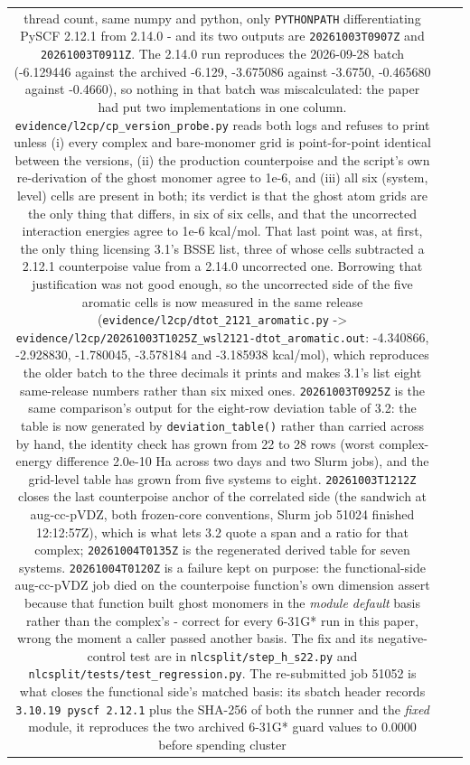 \documentclass[11pt]{article}
\begin{document}
\begin{longtable}{c>{\raggedright\arraybackslash}p{}>{\raggedright\arraybackslash}p{}}
thread count, same numpy and python, only \texttt{PYTHONPATH} differentiating PySCF 2.12.1 from 2.14.0 - and its two outputs are \texttt{20261003T0907Z} and \texttt{20261003T0911Z}. The 2.14.0 run reproduces the 2026-09-28 batch (-6.129446 against the archived -6.129, -3.675086 against -3.6750, -0.465680 against -0.4660), so nothing in that batch was miscalculated: the paper had put two implementations in one column. \texttt{evidence/\allowbreak{}l2cp/\allowbreak{}cp\_\allowbreak{}version\_\allowbreak{}probe.py} reads both logs and refuses to print unless (i) every complex and bare-monomer grid is point-for-point identical between the versions, (ii) the production counterpoise and the script's own re-derivation of the ghost monomer agree to 1e-6, and (iii) all six (system, level) cells are present in both; its verdict is that the ghost atom grids are the only thing that differs, in six of six cells, and that the uncorrected interaction energies agree to 1e-6 kcal/mol. That last point was, at first, the only thing licensing 3.1's BSSE list, three of whose cells subtracted a 2.12.1 counterpoise value from a 2.14.0 uncorrected one. Borrowing that justification was not good enough, so the uncorrected side of the five aromatic cells is now measured in the same release (\texttt{evidence/\allowbreak{}l2cp/\allowbreak{}dtot\_\allowbreak{}2121\_\allowbreak{}aromatic.py} -> \texttt{evidence/\allowbreak{}l2cp/\allowbreak{}20261003T1025Z\_\allowbreak{}wsl2121-dtot\_\allowbreak{}aromatic.out}: -4.340866, -2.928830, -1.780045, -3.578184 and -3.185938 kcal/mol), which reproduces the older batch to the three decimals it prints and makes 3.1's list eight same-release numbers rather than six mixed ones. \texttt{20261003T0925Z} is the same comparison's output for the eight-row deviation table of 3.2: the table is now generated by \texttt{deviation\_table()} rather than carried across by hand, the identity check has grown from 22 to 28 rows (worst complex-energy difference 2.0e-10 Ha across two days and two Slurm jobs), and the grid-level table has grown from five systems to eight. \texttt{20261003T1212Z} closes the last counterpoise anchor of the correlated side (the sandwich at aug-cc-pVDZ, both frozen-core conventions, Slurm job 51024 finished 12:12:57Z), which is what lets 3.2 quote a span and a ratio for that complex; \texttt{20261004T0135Z} is the regenerated derived table for seven systems. \texttt{20261004T0120Z} is a failure kept on purpose: the functional-side aug-cc-pVDZ job died on the counterpoise function's own dimension assert because that function built ghost monomers in the \emph{module default} basis rather than the complex's - correct for every 6-31G* run in this paper, wrong the moment a caller passed another basis. The fix and its negative-control test are in \texttt{nlcsplit/step\_h\_s22.py} and \texttt{nlcsplit/\allowbreak{}tests/\allowbreak{}test\_\allowbreak{}regression.py}. The re-submitted job 51052 is what closes the functional side's matched basis: its sbatch header records \texttt{3.10.19 pyscf 2.12.1} plus the SHA-256 of both the runner and the \emph{fixed} module, it reproduces the two archived 6-31G* guard values to 0.0000 before spending cluster 
\end{longtable}
\end{document}
